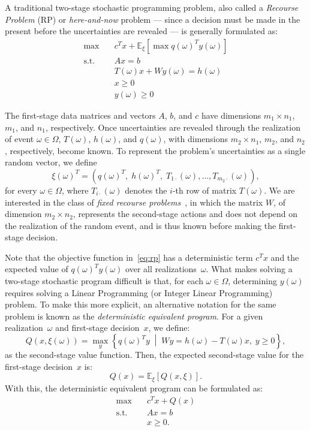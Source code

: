 A traditional two-stage stochastic programming problem, also called a
\emph{Recourse Problem} (RP) or \emph{here-and-now} problem — since a decision
must be made in the present before the uncertainties are revealed — is generally
formulated as:
\begin{align}
	\max \quad        & c^{T} x + \mathbb{E}_{\xi} \left[ \max q(\omega)^{T} y(\omega) \right] \nonumber \\
	\text{s.t.} \quad & A x = b \nonumber                                                                \\
	                  & T(\omega)x + W y(\omega) = h(\omega) \nonumber                                   \\
	                  & x \geq 0 \nonumber                                                               \\
	                  & y(\omega) \geq 0
	\label{eq:rp}
\end{align}

The first-stage data matrices and vectors $A$, $b$, and $c$ have dimensions
$m_{1} \times n_{1}$, $m_{1}$, and $n_{1}$, respectively. Once uncertainties are
revealed through the realization of event $\omega \in \Omega$, $T(\omega)$,
$h(\omega)$, and $q(\omega)$, with dimensions $m_{2} \times n_{1}$, $m_{2}$, and
$n_{2}$, respectively, become known. To represent the problem's uncertainties as
a single random vector, we define
\[
	\xi(\omega)^{T} = \left(q(\omega)^{T}, \; h(\omega)^{T}, \; T_{1\cdot}(\omega), \ldots, T_{m_{2}\cdot}(\omega) \right),
\]
for every $\omega \in \Omega$, where $T_{i\cdot}(\omega)$ denotes the $i$-th row
of matrix $T(\omega)$. We are interested in the class of \emph{fixed recourse
	problems}~\cite{birge:2011}, in which the matrix $W$, of dimension $m_{2}
	\times n_{2}$, represents the second-stage actions and does not depend on the
realization of the random event, and is thus known before making the first-stage
decision.

Note that the objective function in~\eqref{eq:rp} has a deterministic term
$c^{T}x$ and the expected value of $q(\omega)^{T} y(\omega)$ over all
realizations~$\omega$. What makes solving a two-stage stochastic program
difficult is that, for each $\omega \in \Omega$, determining $y(\omega)$
requires solving a Linear Programming (or Integer Linear Programming) problem.
To make this more explicit, an alternative notation for the same problem is
known as the \emph{deterministic equivalent program}. For a given
realization~$\omega$ and first-stage decision~$x$, we define:
\[
	Q(x, \xi(\omega)) = \max_{y} \left\{ q(\omega)^{T} y \; \middle| \; W y = h(\omega) - T(\omega) x, \; y \geq 0 \right\},
\]
as the second-stage value function. Then, the expected second-stage value for
the first-stage decision~$x$ is:
\[
	Q(x) = \mathbb{E}_{\xi} \left[ Q(x, \xi) \right].
\]
With this, the deterministic equivalent program can be formulated as:
\begin{align}
	\max \quad        & c^{T} x + Q(x) \nonumber \\
	\text{s.t.} \quad & A x = b \nonumber        \\
	                  & x \geq 0.
	\label{eq:rp_det}
\end{align}


